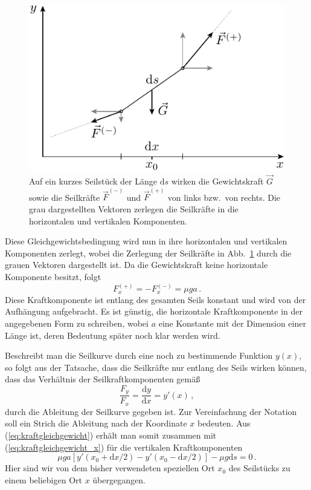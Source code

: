 \documentclass[twocolumn,nobalancelastpage]{revtex4}
\begin{document}
\begin{figure}
 \includegraphics[width=0.8\columnwidth]{kraefte}
 \caption{Auf ein kurzes Seilstück der Länge $\mathrm{d}s$ wirken
	  die Gewichtskraft $\vec G$ sowie die Seilkräfte $\vec F^{(-)}$
	  und $\vec F^{(+)}$ von links bzw.\ von rechts. Die grau
	  dargestellten Vektoren zerlegen die Seilkräfte in die
	  horizontalen und vertikalen Komponenten.}
 \label{fig:kraefte}
\end{figure}

Diese Gleichgewichtsbedingung wird nun in ihre horizontalen und
vertikalen Komponenten zerlegt, wobei die Zerlegung der Seilkräfte in
Abb.~\ref{fig:kraefte} durch die grauen Vektoren dargestellt ist. Da
die Gewichtskraft keine horizontale Komponente besitzt, folgt
\begin{equation}
 F^{(+)}_x = -F^{(-)}_x = \mu g a\,.
 \label{eq:kraftgleichgewicht_x}
\end{equation}
Diese Kraftkomponente ist entlang des gesamten Seils konstant und wird
von der Aufhängung aufgebracht. Es ist günstig, die horizontale
Kraftkomponente in der angegebenen Form zu schreiben, wobei $a$ eine
Konstante mit der Dimension einer Länge ist, deren Bedeutung später
noch klar werden wird.

Beschreibt man die Seilkurve durch eine noch zu bestimmende Funktion
$y(x)$, so folgt aus der Tatsache, dass die Seilkräfte nur entlang des
Seils wirken können, dass das Verhältnis der Seilkraftkomponenten
gemäß
\begin{equation}
 \frac{F_y}{F_x} = \frac{\mathrm{d}y}{\mathrm{d}x} = y'(x)\,,
 \label{eq:kraftverhaeltnis}
\end{equation}
durch die Ableitung der Seilkurve gegeben ist. Zur Vereinfachung der
Notation soll ein Strich die Ableitung nach der Koordinate $x$
bedeuten. Aus (\ref{eq:kraftgleichgewicht}) erhält man somit zusammen
mit (\ref{eq:kraftgleichgewicht_x}) für die vertikalen
Kraftkomponenten
\begin{equation}
 \mu ga\left[y'(x_0+\mathrm{d}x/2)-y'(x_0-\mathrm{d}x/2)\right]-\mu
 g\mathrm{d}s = 0\,.
\end{equation}
Hier sind wir von dem bisher verwendeten speziellen Ort $x_0$ des
Seilstücks zu einem beliebigen Ort $x$ übergegangen.
\end{document}
